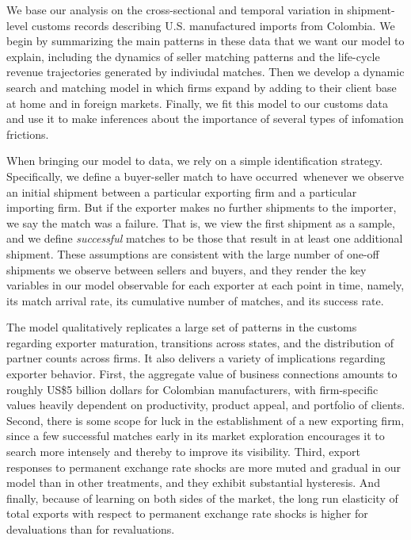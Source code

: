\documentclass[12pt]{article}
\begin{document}
We base our analysis on the cross-sectional and temporal variation in
shipment-level customs records describing U.S. manufactured imports from
Colombia. We begin by summarizing the main patterns in these data that we
want our model to explain, including the dynamics of seller matching
patterns and the life-cycle revenue trajectories generated by indiviudal
matches. Then we develop a dynamic search and matching model in which firms
expand by adding to their client base at home and in foreign markets.
Finally, we fit this model to our customs data and use it to make inferences
about the importance of several types of infomation frictions.

When bringing our model to data, we rely on a simple identification
strategy. Specifically, we define a buyer-seller match to have occurred\
whenever we observe an initial shipment between a particular exporting firm
and a particular importing firm. But if the exporter makes no further
shipments to the importer, we say the match was a failure. That is, we view
the first shipment as a sample, and we define \textit{successful} matches to
be those that result in at least one additional shipment. These assumptions
are consistent with the large number of one-off shipments we observe between
sellers and buyers, and they render the key variables in our model
observable for each exporter at each point in time, namely, its match
arrival rate, its cumulative number of matches, and its success rate.

The model qualitatively replicates a large set of patterns in the customs
regarding exporter maturation, transitions across states, and the
distribution of partner counts across firms. It also delivers a variety of
implications regarding exporter behavior. First, the aggregate value of
business connections amounts to roughly US\$5 billion dollars for Colombian
manufacturers, with firm-specific values heavily dependent on productivity,
product appeal, and portfolio of clients. Second, there is some scope for
luck in the establishment of a new exporting firm, since a few successful
matches early in its market exploration encourages it to search more
intensely and thereby to improve its visibility.  Third, export responses to
permanent exchange rate shocks are more muted and gradual in our model than in other treatments, and they exhibit substantial hysteresis. And finally, because of
learning on both sides of the market, the long run elasticity of total
exports with respect to permanent exchange rate shocks is higher for
devaluations than for revaluations. 
\end{document}
